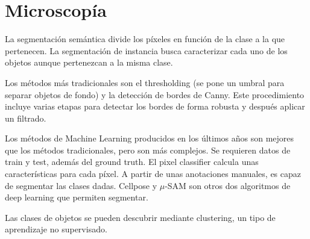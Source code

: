 \chapter{Microscopía}
La segmentación semántica divide los píxeles en función de la clase a la que pertenecen. La segmentación de instancia busca caracterizar cada uno de los objetos aunque pertenezcan a la misma clase. 

Los métodos más tradicionales son el thresholding (se pone un umbral para separar objetos de fondo) y la detección de bordes de Canny. Este procedimiento incluye varias etapas para detectar los bordes de forma robusta y después aplicar un filtrado. 

Los métodos de Machine Learning producidos en los últimos años son mejores que los métodos tradicionales, pero son más complejos. Se requieren datos de train y test, además del ground truth. El pixel classifier calcula unas características para cada píxel. A partir de unas anotaciones manuales, es capaz de segmentar las clases dadas. Cellpose y $\mu$-SAM son otros dos algoritmos de deep learning que permiten segmentar. 

Las clases de objetos se pueden descubrir mediante clustering, un tipo de aprendizaje no supervisado.
